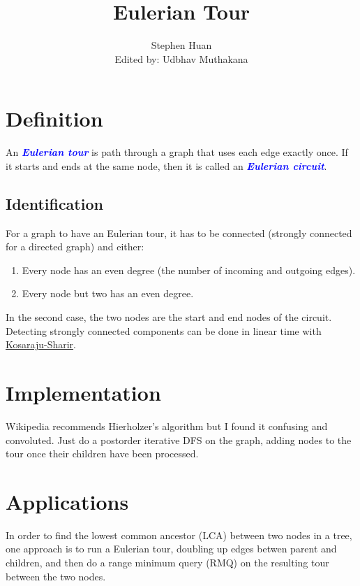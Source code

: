\documentclass[11pt, oneside]{article}
\title{Eulerian Tour}
\author{Stephen Huan \\ Edited by: Udbhav Muthakana}
\newcommand{\emphasis}[1]{\textcolor{blue}{\textbf{\textit{#1}}}}
\begin{document}
\maketitle

\section{Definition}

An \emphasis{Eulerian tour} is path through a graph that uses each edge exactly once.
If it starts and ends at the same node, then it is called an \emphasis{Eulerian circuit}.

\subsection{Identification}
For a graph to have an Eulerian tour, it has to be connected (strongly connected for a directed graph) and either:

\begin{enumerate}
  \item Every node has an even degree (the number of incoming and outgoing edges).
  \item Every node but two has an even degree.
\end{enumerate}

In the second case, the two nodes are the start and end nodes of the circuit.
Detecting strongly connected components can be done in linear time with \href{https://activities.tjhsst.edu/sct/lectures/1920/2019_11_01_Strongly_Connected_Components.pdf}{Kosaraju-Sharir}.

\section{Implementation}

Wikipedia recommends Hierholzer's algorithm but I found it confusing and convoluted.
Just do a postorder iterative DFS on the graph, adding nodes to the tour once their children have been processed.

\section{Applications}

In order to find the lowest common ancestor (LCA) between two nodes in a tree,
one approach is to run a Eulerian tour, doubling up edges betwen parent and children,
and then do a range minimum query (RMQ) on the resulting tour between the two nodes.
\end{document}
